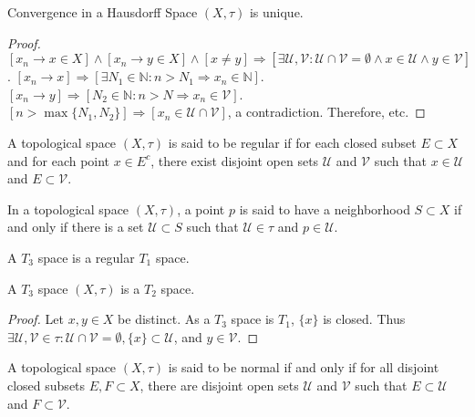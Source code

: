         \begin{theorem}
        Convergence in a Hausdorff Space $(X,\tau)$ is unique.
        \end{theorem}
        \begin{proof}
        $[x_n \rightarrow x\in X]\land [x_n \rightarrow y\in X]\land[x\ne y]\Rightarrow [\exists \mathcal{U},\mathcal{V}:\mathcal{U}\cap \mathcal{V}=\emptyset\land x\in \mathcal{U}\land y\in \mathcal{V}]$. $[x_n\rightarrow x]\Rightarrow [\exists N_1\in \mathbb{N}:n>N_1\Rightarrow x_n \in \mathbb{N}]$. $[x_n\rightarrow y]\Rightarrow [N_2\in \mathbb{N}:n>N\Rightarrow x_n \in \mathcal{V}]$. $[n>\max\{N_1,N_2\}]\Rightarrow [x_n \in \mathcal{U}\cap \mathcal{V}]$, a contradiction. Therefore, etc.
        \end{proof}
        \begin{definition}
        A topological space $(X,\tau)$ is said to be regular if for each closed subset $E\subset X$ and for each point $x\in E^c$, there exist disjoint open sets $\mathcal{U}$ and $\mathcal{V}$ such that $x\in \mathcal{U}$ and $E\subset \mathcal{V}$.
        \end{definition} 
        \begin{definition}
        In a topological space $(X,\tau)$, a point $p$ is said to have a neighborhood $S\subset X$ if and only if there is a set $\mathcal{U}\subset S$ such that $\mathcal{U}\in \tau$ and $p\in \mathcal{U}$.
        \end{definition}
        \begin{definition}
        A $T_3$ space is a regular $T_1$ space.
        \end{definition}
        \begin{theorem}
        A $T_3$ space $(X,\tau)$ is a $T_2$ space.
        \end{theorem}
        \begin{proof}
        Let $x,y\in X$ be distinct. As a $T_3$ space is $T_1$, $\{x\}$ is closed. Thus $\exists \mathcal{U},\mathcal{V}\in\tau: \mathcal{U}\cap\mathcal{V}=\emptyset, \{x\}\subset \mathcal{U}$, and $y\in \mathcal{V}$.
        \end{proof}
        \begin{definition}
        A topological space $(X,\tau)$ is said to be normal if and only if for all disjoint closed subsets $E,F\subset X$, there are disjoint open sets $\mathcal{U}$ and $\mathcal{V}$ such that $E\subset \mathcal{U}$ and $F\subset \mathcal{V}$.
        \end{definition}
